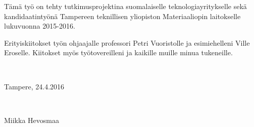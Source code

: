 \documentclass[12pt,a4paper,finnish]{tutthesis}
\begin{document}

Tämä työ on tehty tutkimusprojektina suomalaiselle teknologiayritykselle sekä
kandidaatintyönä Tampereen teknillisen yliopiston Materiaaliopin laitokselle
lukuvuonna 2015-2016.

Erityiskiitokset työn ohjaajalle professori Petri Vuoristolle ja esimiehelleni Ville Eroselle.
Kiitokset myös työtovereilleni ja kaikille muille minua tukeneille.

~ 

Tampere, 24.4.2016

~


Miikka Hevosmaa



%
%

\renewcommand\contentsname{Sisällys}         %
\setcounter{tocdepth}{3}                      %
\tableofcontents                              %

\renewcommand\listfigurename{Kuvaluettelo}    %
\listoffigures                                 %
\markboth{}{}                                  %

\renewcommand\listtablename{Taulukkoluettelo} %
\listoftables                                  %
\markboth{}{}                                  %


\end{document}
